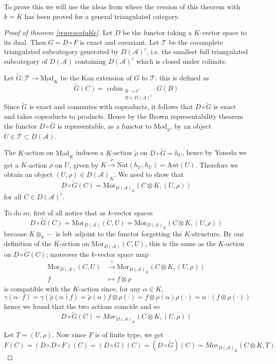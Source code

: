 \documentclass{amsart}
\begin{document}
To prove this we will use the ideas from \cite[Lemma 2.14]{failure} where the version of this theorem with $k=K$ has been proved for a general triangulated category.

\begin{proof}[Proof of theorem \ref{representable}]
Let $D$ be the functor taking a $K$-vector space to its dual. Then $G=D\circ F$ is exact and covariant. Let $\mathscr{T}$ be the cocomplete triangulated subcategory generated by $D(\mathscr{A})^{c}$, i.e. the smallest full triangulated subcategory of $D(\mathscr{A})$ containing $D(\mathscr{A})^{c}$ which is closed under colimits.

Let $\tilde{G}:\mathscr{T}{\rightarrow}\underline{\mathrm{Mod}}_{K}$ be the Kan extension of $G$ to $\mathscr{T}$: this is defined as
$$\tilde{G}(C)=\mathop{\mathrm{colim}}_{\substack{B \to C\\ B\in D(\mathscr{A})^{c}}} G(B)$$
Since $\tilde{G}$ is exact and commutes with coproducts, it follows that $D\circ\tilde{G}$ is exact and takes coproducts to products. Hence by the Brown representability theorem \cite[Theorem 8.3.3]{tricat} the functor $D\circ\tilde{G}$ is representable, as a functor to $\underline{\mathrm{Mod}}_{k}$, by an object $U\in \mathscr{T}\subset D(\mathscr{A})$.

The $K$-action on $\underline{\mathrm{Mod}}_{K}$ induces a $K$-action $\tilde{\rho}$ on $D\circ\tilde{G}=h_{U}$, hence by Yoneda we get a $K$-action $\rho$ on $U$, given by $K\stackrel{\rho}{\rightarrow}\text{Nat}(h_{U},h_{U})=\text{Aut}(U)$. Therefore we obtain an object $(U,\rho)\in D(\mathscr{A})_{K}$. We need to show that 
$$D\circ\tilde{G}(C)=\text{Mor}_{D(\mathscr{A})_{K}}(C\otimes K,(U,\rho))$$
for all $C\in D(\mathscr{A})^{c}$.

To do so, first of all notice that as $k$-vector spaces
$$D\circ\tilde{G}(C)=\text{Mor}_{D(\mathscr{A})}(C,U)=\text{Mor}_{D(\mathscr{A})_{K}}(C\otimes K,(U,\rho))$$
because $K\otimes_{k}-$ is left adjoint to the functor forgetting the $K$-structure. By our definition of the $K$-action on $\text{Mor}_{D(\mathscr{A})}(C,U)$, this is the same as the $K$-action on $D\circ\tilde{G}(C)$; moreover the $k$-vector space map
\begin{align*}
\text{Mor}_{D(\mathscr{A})}(C,U) &\stackrel{\gamma}{\rightarrow}\text{Mor}_{D(\mathscr{A})_{K}}(C\otimes K,(U,\rho))\\
f &\mapsto f\otimes \rho
\end{align*}
is compatible with the $K$-action since, for any $\alpha\in K$,
$$\gamma(\alpha\cdot f)=\gamma(\tilde{\rho}(\alpha)f)=\tilde{\rho}(\alpha)f\otimes\rho(\cdot)=f\otimes\rho(\alpha)\rho(\cdot)=\alpha\cdot(f\otimes\rho(\cdot))$$
hence we found that the two actions coincide and so 
$$D\circ\tilde{G}(C)=Mor_{D(\mathscr{A})_{K}}(C\otimes K,(U,\rho))$$

Let $T=(U,\rho)$. Now since $F$ is of finite type, we get
$$F(C)=(D\circ D\circ F)(C)=(D\circ G)(C)=(D\circ\tilde{G})(C)=Mor_{D(\mathscr{A})_{K}}(C\otimes K,T)$$
\end{proof}
\end{document}
